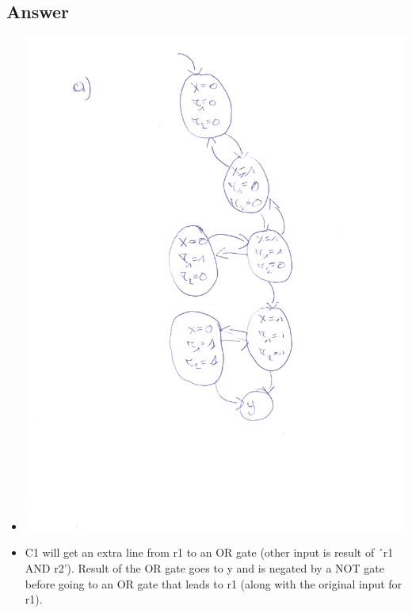 \documentclass[12pt]{article}
\begin{document}
\subsection*{Answer}
\begin{itemize}
	\item \begin{centering}
		\includegraphics*[scale=0.45]{211a.jpg}
	\end{centering}
	\item C1 will get an extra line from r1 to an OR gate (other input is result of ´r1 AND r2'). Result of the OR gate goes to y and is negated by a NOT gate before going to an OR gate that leads to r1 (along with the original input for r1).
\end{itemize}
\end{document}
